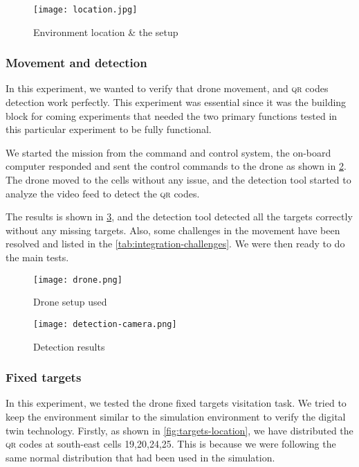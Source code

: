 \documentclass[../main.tex]{subfiles}
\begin{document}
\begin{figure}[H]
	\centering
	\texttt{[image: location.jpg]}
	\caption{Environment location \& the setup}
	\label{fig:testing-location}
\end{figure} 

\subsubsection{Movement and detection}

In this experiment, we wanted to verify that drone movement, and
\textsc{qr} codes detection work perfectly. This experiment was 
essential since it was the building block for coming experiments
that needed the two primary functions tested in this particular
experiment to be fully functional.

We started the mission from the command and control system, 
the on-board computer responded and sent the control commands 
to the drone as shown in \cref{fig:experiment-drone}.
The drone moved to the cells without any issue,
and the detection tool started to analyze 
the video feed to detect the \textsc{qr} codes.

The results is shown in \cref{fig:detection-camera}, 
and the detection tool detected all the targets correctly 
without any missing targets. Also, some challenges 
in the movement have been resolved and listed in 
the \cref{tab:integration-challenges}. 
We were then ready to do the main tests.

\begin{figure}[H]
	\centering
	\texttt{[image: drone.png]}
	\caption{Drone setup used}
	\label{fig:experiment-drone}
\end{figure} 

\begin{figure}[H]
	\centering
	\texttt{[image: detection-camera.png]}
	\caption{Detection results}
	\label{fig:detection-camera}
\end{figure}

\subsubsection{Fixed targets}

In this experiment, we tested the drone fixed targets
visitation task. We tried to keep the environment similar
to the simulation environment to verify the digital twin technology.
Firstly, as shown in \cref{fig:targets-location},
we have distributed the \textsc{qr} codes at south-east cells 
{19,20,24,25}. This is because we were following 
the same normal distribution that had been used in the simulation.
\end{document}
